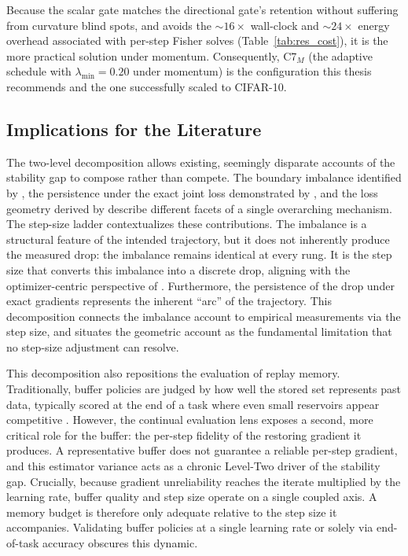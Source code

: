 Because the scalar gate matches the directional gate's retention without suffering from curvature blind spots, and avoids the ${\sim}16\times$ wall-clock and ${\sim}24\times$ energy overhead associated with per-step Fisher solves (Table~\ref{tab:res_cost}), it is the more practical solution under momentum. Consequently, C7$_M$ (the adaptive schedule with $\lambda_{\min} = 0.20$ under momentum) is the configuration this thesis recommends and the one successfully scaled to CIFAR-10.

\subsection{Implications for the Literature}
\label{subsec:disc_literature}

The two-level decomposition allows existing, seemingly disparate accounts of the stability gap to compose rather than compete. The boundary imbalance identified by \citet{delange2023continualevaluationlifelonglearning}, the persistence under the exact joint loss demonstrated by \citet{hess2024complementaryperspectivescontinuallearning}, and the loss geometry derived by \citet{kao2021naturalcontinuallearningsuccess} describe different facets of a single overarching mechanism. The step-size ladder contextualizes these contributions. The imbalance is a structural feature of the intended trajectory, but it does not inherently produce the measured drop: the imbalance remains identical at every rung. It is the step size that converts this imbalance into a discrete drop, aligning with the optimizer-centric perspective of \citet{obis2025optimizersstabilitygap}. Furthermore, the persistence of the drop under exact gradients represents the inherent ``arc'' of the trajectory. This decomposition connects the imbalance account to empirical measurements via the step size, and situates the geometric account as the fundamental limitation that no step-size adjustment can resolve.

This decomposition also repositions the evaluation of replay memory. Traditionally, buffer policies are judged by how well the stored set represents past data, typically scored at the end of a task where even small reservoirs appear competitive \citep{aljundi2019gradientbasedsampleselection, bang2021rainbowmemorycontinuallearning, chaudhry2019tinyepisodicmemories}. However, the continual evaluation lens exposes a second, more critical role for the buffer: the per-step fidelity of the restoring gradient it produces. A representative buffer does not guarantee a reliable per-step gradient, and this estimator variance acts as a chronic Level-Two driver of the stability gap. Crucially, because gradient unreliability reaches the iterate multiplied by the learning rate, buffer quality and step size operate on a single coupled axis. A memory budget is therefore only adequate relative to the step size it accompanies. Validating buffer policies at a single learning rate or solely via end-of-task accuracy obscures this dynamic.

